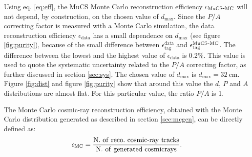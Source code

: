 \documentclass[a4paper,11pt]{article}
\def\myhyphen{{\hbox{-}}}
\begin{document}
Using eq. \eqref{eq:eff}, the MuCS Monte Carlo reconstruction efficiency $\epsilon_{\mathrm{MuCS\myhyphen MC}}$ will not depend, by construction, on the chosen value of $d_{\mathrm{max}}$. Since the $P/A$ correcting factor is measured with a Monte Carlo simulation, the data reconstruction efficiency $\epsilon_{\mathrm{data}}$ has a small dependence on $d_{\mathrm{max}}$ (see figure \ref{fig:purity}), because of the small difference between $\epsilon^{\mathrm{data}}_{\mathrm{tag}}$ and $\epsilon^{\mathrm{MuCS\myhyphen MC}}_{\mathrm{tag}}$.
The difference between the lowest and the highest value of $\epsilon_{\mathrm{data}}$ is 0.2\%. This value is used to quote the systematic uncertainty related to the $P/A$ correcting factor, as further discussed in section \ref{sec:sys}.
The chosen value of $d_{\mathrm{max}}$ is $d_{\mathrm{max}}=32~\mathrm{cm}$. Figure \ref{fig:dist} and figure \ref{fig:purity} show that around this value the $d$, $P$ and $A$ distributions are almost flat. For this particular value,  the ratio $P/A$ is 1.%




The Monte Carlo cosmic-ray reconstruction efficiency, obtained with the Monte Carlo distribution generated as described in section \ref{sec:mcgen}, can be directly defined as:
\begin{equation}
  \epsilon_{\mathrm{MC}} = \frac{\mathrm{N.~of~reco.~cosmic\myhyphen ray~tracks}}{\mathrm{N.~of~generated~cosmic rays}}.
\end{equation}
\end{document}
